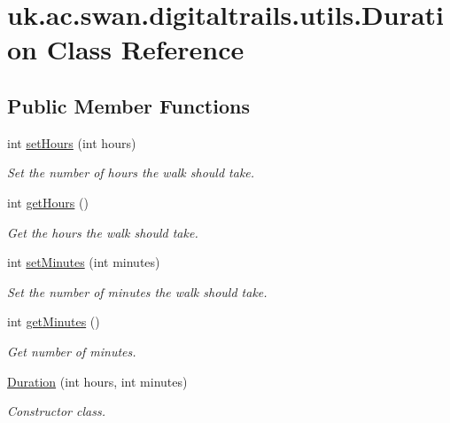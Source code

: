 \hypertarget{classuk_1_1ac_1_1swan_1_1digitaltrails_1_1utils_1_1_duration}{\section{uk.\+ac.\+swan.\+digitaltrails.\+utils.\+Duration Class Reference}
\label{classuk_1_1ac_1_1swan_1_1digitaltrails_1_1utils_1_1_duration}
}
\subsection*{Public Member Functions}
\begin{DoxyCompactItemize}
\item 
int \hyperlink{classuk_1_1ac_1_1swan_1_1digitaltrails_1_1utils_1_1_duration_a98f0315c584688d9977c7741329f4324}{set\+Hours} (int hours)
\begin{DoxyCompactList}\small\item\em Set the number of hours the walk should take. \end{DoxyCompactList}\item 
int \hyperlink{classuk_1_1ac_1_1swan_1_1digitaltrails_1_1utils_1_1_duration_a3de407ce94342dd17fa0dfbf7fee9e73}{get\+Hours} ()
\begin{DoxyCompactList}\small\item\em Get the hours the walk should take. \end{DoxyCompactList}\item 
int \hyperlink{classuk_1_1ac_1_1swan_1_1digitaltrails_1_1utils_1_1_duration_a44eba958b5ade57a5d04018dd54f3a8a}{set\+Minutes} (int minutes)
\begin{DoxyCompactList}\small\item\em Set the number of minutes the walk should take. \end{DoxyCompactList}\item 
int \hyperlink{classuk_1_1ac_1_1swan_1_1digitaltrails_1_1utils_1_1_duration_aa3990901c7030ecbc2f380c2aed52b64}{get\+Minutes} ()
\begin{DoxyCompactList}\small\item\em Get number of minutes. \end{DoxyCompactList}\item 
\hyperlink{classuk_1_1ac_1_1swan_1_1digitaltrails_1_1utils_1_1_duration_a2c6762ee7898586c3d43dca589b12bd8}{Duration} (int hours, int minutes)
\begin{DoxyCompactList}\small\item\em Constructor class. \end{DoxyCompactList}\item 

\end{DoxyCompactItemize}

